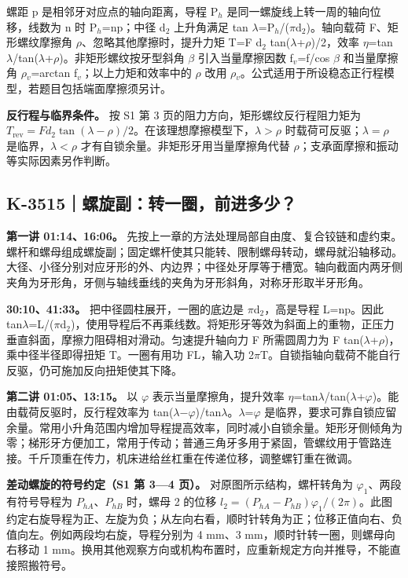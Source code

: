 \documentclass[zihao=5,a4paper,UTF8,fontset=fandol]{ctexart}
\begin{document}
螺距 p 是相邻牙对应点的轴向距离，导程 P$_{h}$ 是同一螺旋线上转一周的轴向位移，线数为 n 时 P$_{h}$=np；中径 d$_{2}$ 上升角满足 tan $\lambda$=P$_{h}$/($\pi$d$_{2}$)。轴向载荷 F、矩形螺纹摩擦角 $\rho$、忽略其他摩擦时，提升力矩 T=F d$_{2}$ tan($\lambda$+$\rho$)/2，效率 $\eta$=tan $\lambda$/tan($\lambda$+$\rho$)。非矩形螺纹按牙型斜角 $\beta$ 引入当量摩擦因数 f$_{v}$=f/cos $\beta$ 和当量摩擦角 $\rho$$_{v}$=arctan f$_{v}$；以上力矩和效率中的 $\rho$ 改用 $\rho$$_{v}$。公式适用于所设稳态正行程模型，若题目包括端面摩擦须另计。


\textbf{反行程与临界条件。} 按 S1 第 3 页的阻力方向，矩形螺纹反行程阻力矩为 $T_{\mathrm{rev}}=Fd_2\tan(\lambda-\rho)/2$。在该理想摩擦模型下，$\lambda>\rho$ 时载荷可反驱；$\lambda=\rho$ 是临界，$\lambda<\rho$ 才有自锁余量。非矩形牙用当量摩擦角代替 $\rho$；支承面摩擦和振动等实际因素另作判断。





\subsection{K-3515｜螺旋副：转一圈，前进多少？}
\label{k-3515}

\textbf{第一讲 01:14、16:06。} 先按上一章的方法处理局部自由度、复合铰链和虚约束。螺杆和螺母组成螺旋副；固定螺杆使其只能转、限制螺母转动，螺母就沿轴移动。大径、小径分别对应牙形的外、内边界；中径处牙厚等于槽宽。轴向截面内两牙侧夹角为牙形角，牙侧与轴线垂线的夹角为牙形斜角，对称牙形取半牙形角。


\textbf{30:10、41:33。} 把中径圆柱展开，一圈的底边是 $\pi$d$_{2}$，高是导程 L=np。因此 tan$\lambda$=L/($\pi$d$_{2}$)，使用导程后不再乘线数。将矩形牙等效为斜面上的重物，正压力垂直斜面，摩擦力阻碍相对滑动。匀速提升轴向力 F 所需圆周力为 F tan($\lambda$+$\rho$)，乘中径半径即得扭矩 T。一圈有用功 FL，输入功 2$\pi$T。自锁指轴向载荷不能自行反驱，仍可施加反向扭矩使其下降。


\textbf{第二讲 01:05、13:15。} 以 $\varphi$ 表示当量摩擦角，提升效率 $\eta$=tan$\lambda$/tan($\lambda$+$\varphi$)。能由载荷反驱时，反行程效率为 tan($\lambda$$-$$\varphi$)/tan$\lambda$。$\lambda$=$\varphi$ 是临界，要求可靠自锁应留余量。常用小升角范围内增加导程提高效率，同时减小自锁余量。矩形牙侧倾角为零；梯形牙方便加工，常用于传动；普通三角牙多用于紧固，管螺纹用于管路连接。千斤顶重在传力，机床进给丝杠重在传递位移，调整螺钉重在微调。


\textbf{差动螺旋的符号约定（S1 第 3—4 页）。} 对原图所示结构，螺杆转角为 $\varphi_1$、两段有符号导程为 $P_{hA}$、$P_{hB}$ 时，螺母 2 的位移 $l_2=(P_{hA}-P_{hB})\varphi_1/(2\pi)$。此图约定右旋导程为正、左旋为负；从左向右看，顺时针转角为正；位移正值向右、负值向左。例如两段均右旋，导程分别为 4 mm、3 mm，顺时针转一圈，则螺母向右移动 1 mm。换用其他观察方向或机构布置时，应重新规定方向并推导，不能直接照搬符号。
\end{document}

